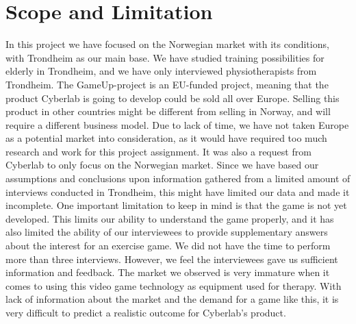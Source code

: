 \section{Scope and Limitation}
In this project we have focused on the Norwegian market with its conditions, with Trondheim as our main base. We have studied training possibilities for elderly in Trondheim, and we have only interviewed physiotherapists from Trondheim. The GameUp-project is an EU-funded project, meaning that the product Cyberlab is going to develop could be sold all over Europe. Selling this product in other countries might be different from selling in Norway, and will require a different business model. Due to lack of time, we have not taken Europe as a potential market into consideration, as it would have required too much research and work for this project assignment. It was also a request from Cyberlab to only focus on the Norwegian market. Since we have based our assumptions and conclusions upon information gathered from a limited amount of interviews conducted in Trondheim, this might have limited our data and made it incomplete. One important limitation to keep in mind is that the game is not yet developed. This limits our ability to understand the game properly, and it has also limited the ability of our interviewees to provide supplementary answers about the interest for an exercise game. We did not have the time to perform more than three interviews. However, we feel the interviewees gave us sufficient information and feedback. The market we observed is very immature when it comes to using this video game technology as equipment used for therapy. With lack of information about the market and the demand for a game like this, it is very difficult to predict a realistic outcome for Cyberlab’s product.

